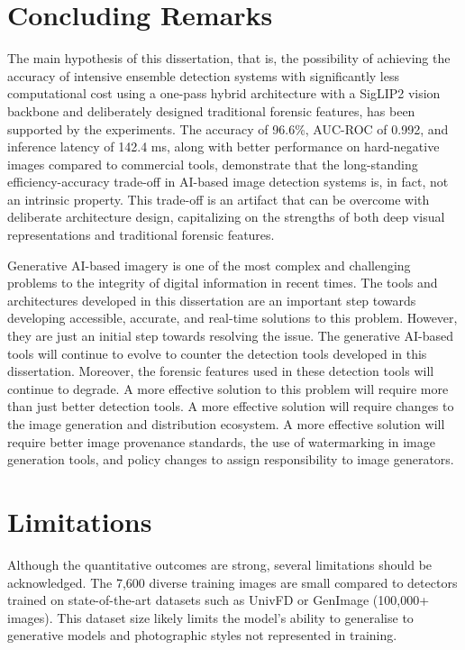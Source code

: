 \section{Concluding Remarks}

The main hypothesis of this dissertation, that is, the possibility of achieving the accuracy of intensive ensemble detection systems with significantly less computational cost using a one-pass hybrid architecture with a SigLIP2 vision backbone and deliberately designed traditional forensic features, has been supported by the experiments. The accuracy of 96.6\%, AUC-ROC of 0.992, and inference latency of 142.4 ms, along with better performance on hard-negative images compared to commercial tools, demonstrate that the long-standing efficiency-accuracy trade-off in AI-based image detection systems is, in fact, not an intrinsic property. This trade-off is an artifact that can be overcome with deliberate architecture design, capitalizing on the strengths of both deep visual representations and traditional forensic features.

Generative AI-based imagery is one of the most complex and challenging problems to the integrity of digital information in recent times. The tools and architectures developed in this dissertation are an important step towards developing accessible, accurate, and real-time solutions to this problem. However, they are just an initial step towards resolving the issue. The generative AI-based tools will continue to evolve to counter the detection tools developed in this dissertation. Moreover, the forensic features used in these detection tools will continue to degrade. A more effective solution to this problem will require more than just better detection tools. A more effective solution will require changes to the image generation and distribution ecosystem. A more effective solution will require better image provenance standards, the use of watermarking in image generation tools, and policy changes to assign responsibility to image generators.

\section{Limitations}

Although the quantitative outcomes are strong, several limitations should be acknowledged. The 7,600 diverse training images are small compared to detectors trained on state-of-the-art datasets such as UnivFD or GenImage (100,000+ images). This dataset size likely limits the model's ability to generalise to generative models and photographic styles not represented in training.

